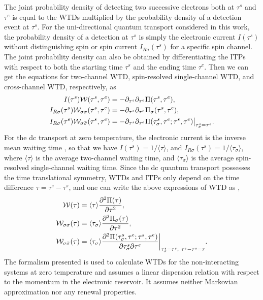 \documentclass[aps,prb,twocolumn,footinbib,showpacs,superscriptaddress,preprintnumbers,amsmath,amssymb]{revtex4-1}
\begin{document}
 
	The joint probability density of detecting two successive electrons both at $\tau^s$ and $\tau^e$ is equal to the WTDs multiplied by the probability density of a detection event at $\tau^s$. For the uni-directional quantum transport considered in this work, the probability density of a detection at $\tau^s$ is simply the electronic current $I(\tau^s)$ without distinguishing spin or spin current $I_{R\sigma}(\tau^s)$ for a specific spin channel. The joint probability density can also be obtained by differentiating the ITPs with respect to both the starting time $\tau^s$ and the ending time $\tau^e$. Then we can get the equations for two-channel WTD, spin-resolved single-channel WTD, and cross-channel WTD, respectively, as \cite{WTD_correlated}
\begin{align}
I(\tau^s) {\cal W}(\tau^s,\tau^e) &= - \partial_{\tau^s}\partial_{\tau^e} \Pi(\tau^s, \tau^e) , \\
I_{R\sigma}(\tau^s) {\cal W}_{\sigma\sigma}(\tau^s, \tau^e) &= -\partial_{\tau^s}\partial_{\tau^e} \Pi_\sigma(\tau^s, \tau^e) , \\
I_{R\sigma}(\tau^s) {\cal W}_{\sigma\bar{\sigma}}(\tau^s, \tau^e) &= -\partial_{\tau^s}\partial_{\tau^e} \Pi(\tau_\sigma^s,\tau^e;\tau^s,\tau^e)\big|_{\tau_\sigma^s=\tau^s} .
\end{align}
For the dc transport at zero temperature, the electronic current is the inverse mean waiting time \cite{WTD2012, WTD_correlated}, so that we have $I(\tau^s) = 1/\langle \tau \rangle$, and $I_{R\sigma}(\tau^s) = 1/\langle \tau_\sigma \rangle$, where $\langle \tau \rangle$ is the average two-channel waiting time, and $\langle \tau_\sigma \rangle$ is the average spin-resolved single-channel waiting time.
	Since the dc quantum transport possesses the time translational symmetry, WTDs and ITPs only depend on the time difference $\tau = \tau^e-\tau^s$, and one can write the above expressions of WTD as \cite{WTD_correlated},
\begin{align}
{\cal W}(\tau) &= \langle \tau \rangle \frac{\partial^2 \Pi(\tau)}{\partial\tau^2}, \\
{\cal W}_{\sigma\sigma}(\tau) &= \langle \tau_\sigma \rangle \frac{\partial^2 \Pi_\sigma(\tau)}{\partial\tau^2},  \\
{\cal W}_{\sigma\bar{\sigma}}(\tau) &= \langle \tau_\sigma \rangle \frac{\partial^2 \Pi(\tau_\sigma^s,\tau^e;\tau^s,\tau^e)}{\partial\tau_\sigma^s \partial\tau^e} \bigg|_{\tau_\sigma^s=\tau^s; \ \tau^e-\tau^s=\tau} .
\end{align}
The formalism presented is used to calculate WTDs for the non-interacting systems at zero temperature and assumes a linear dispersion relation with respect to the momentum in the electronic reservoir. It assumes neither Markovian approximation nor any renewal properties.
 
\end{document}
